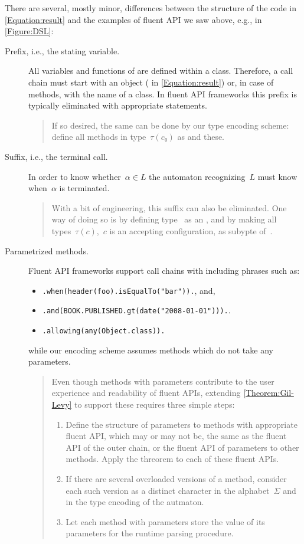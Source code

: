 There are several, mostly minor, differences between the structure of the \Java code
in \cref{Equation:result}
and the examples of fluent API we saw above, e.g., in \cref{Figure:DSL}:
\begin{description}
  \item[Prefix, i.e., the stating  variable.]
  All variables and functions of \Java are defined within a class.
  Therefore, a call chain must start with an object ( in \cref{Equation:result})
  or, in case of  methods, with the name of a class.
  In fluent API frameworks this prefix is typically eliminated
  with appropriate  statements.
  \begin{quote}
  If so desired, the same can be done by our type encoding scheme: define all
  methods in type~$τ(c₀)$ as  and  these.
\end{quote}
  \item[Suffix, i.e., the terminal  call.]
  In order to know whether~$α∈L$ the automaton recognizing~$L$ must
  know when~$α$ is terminated.
  \begin{quote}
  With a bit of engineering, this suffix can also be eliminated.
  One way of doing so is by defining type~ as an , and by making all types~$τ(c)$,~$c$ is
  an accepting configuration, as subypte of~.
  \end{quote}
  \item[Parametrized methods.]
  Fluent API frameworks support call chains with including phrases such as:
    \lstset{language=Java,style=code} 
  \begin{itemize}
    \item \lstinline{.when(header(foo).isEqualTo("bar")).}, and,
    \item \lstinline{.and(BOOK.PUBLISHED.gt(date("2008-01-01"))).}.
    \item \lstinline{.allowing(any(Object.class)).}
  \end{itemize}
  while our encoding scheme assumes methods which do not take any parameters.
  \begin{quote}
    Even though methods with parameters contribute to the user
      experience and readability of fluent APIs, extending
      \cref{Theorem:Gil-Levy} to support these requires three simple steps: 
      \begin{enumerate}
        \item Define the structure of parameters to methods with appropriate fluent API, which may or
          may not be, the same as the fluent API of the outer chain, or the fluent API of parameters to
          other methods. Apply the threorem to each of these fluent APIs.
        \item
          If there are several overloaded versions of a method, consider each such version as a distinct
          character in the alphabet~$Σ$ and in the type encoding of the autmaton.
        \item
          Let each method with parameters store the value of its parameters for the
            runtime parsing procedure.
      \end{enumerate}
  \end{quote}
\end{description}
